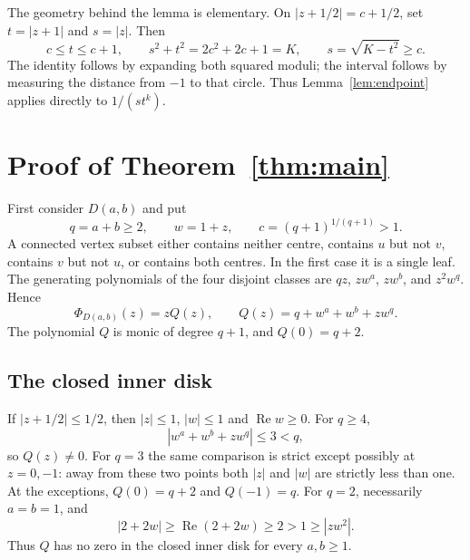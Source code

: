 \documentclass[11pt]{article}
\begin{document}
The geometry behind the lemma is elementary. On
$|z+1/2|=c+1/2$, set $t=|z+1|$ and $s=|z|$. Then
\begin{equation}\label{eq:geometry}
 c\leq t\leq c+1,\qquad s^2+t^2=2c^2+2c+1=K,
 \qquad s=\sqrt{K-t^2}\geq c.
\end{equation}
The identity follows by expanding both squared moduli; the interval
follows by measuring the distance from $-1$ to that circle.
Thus Lemma~\ref{lem:endpoint} applies directly to $1/(s t^k)$.

\section{Proof of Theorem~\ref{thm:main}}

First consider $D(a,b)$ and put
\[
 q=a+b\geq2,\qquad w=1+z,\qquad c=(q+1)^{1/(q+1)}>1.
\]
A connected vertex subset either contains neither centre, contains $u$
but not $v$, contains $v$ but not $u$, or contains both centres.
In the first case it is a single leaf. The generating polynomials of
the four disjoint classes are $qz$, $zw^a$, $zw^b$, and $z^2w^q$.
Hence
\begin{equation}\label{eq:counting}
 \Phi_{D(a,b)}(z)=zQ(z),\qquad
 Q(z)=q+w^a+w^b+zw^q.
\end{equation}
The polynomial $Q$ is monic of degree $q+1$, and $Q(0)=q+2$.

\subsection*{The closed inner disk}
If $|z+1/2|\leq1/2$, then $|z|\leq1$, $|w|\leq1$ and
$\operatorname{Re}w\geq0$. For $q\geq4$,
\[
 |w^a+w^b+zw^q|\leq3<q,
\]
so $Q(z)\ne0$. For $q=3$ the same comparison is strict except possibly
at $z=0,-1$: away from these two points both $|z|$ and $|w|$ are
strictly less than one. At the exceptions, $Q(0)=q+2$ and $Q(-1)=q$.
For $q=2$, necessarily $a=b=1$, and
\[
 |2+2w|\geq\operatorname{Re}(2+2w)\geq2>1\geq|zw^2|.
\]
Thus $Q$ has no zero in the closed inner disk for every $a,b\geq1$.
\end{document}
